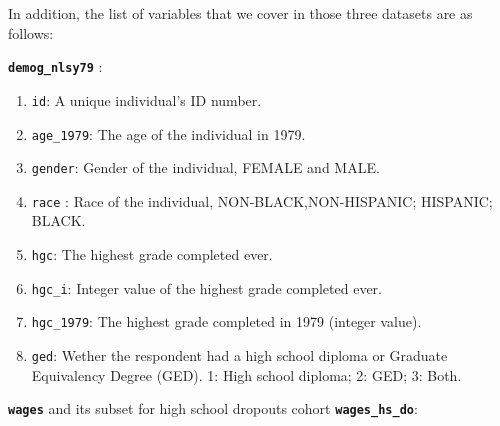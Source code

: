 \documentclass{article}
\begin{document}
In addition, the list of variables that we cover in those three datasets are as follows:

\textbf{\texttt{demog\_nlsy79}} :

\begin{enumerate}
\def\labelenumi{\arabic{enumi}.}
\tightlist
\item
  \texttt{id}: A unique individual's ID number.
\item
  \texttt{age\_1979}: The age of the individual in 1979.
\item
  \texttt{gender}: Gender of the individual, FEMALE and MALE.
\item
  \texttt{race} : Race of the individual, NON-BLACK,NON-HISPANIC; HISPANIC; BLACK.
\item
  \texttt{hgc}: The highest grade completed ever.
\item
  \texttt{hgc\_i}: Integer value of the highest grade completed ever.
\item
  \texttt{hgc\_1979}: The highest grade completed in 1979 (integer value).
\item
  \texttt{ged}: Wether the respondent had a high school diploma or Graduate Equivalency Degree (GED). 1: High school diploma; 2: GED; 3: Both.
\end{enumerate}

\textbf{\texttt{wages}} and its subset for high school dropouts cohort \textbf{\texttt{wages\_hs\_do}}:
\end{document}
